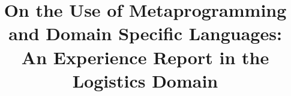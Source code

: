\documentclass[twocolumn]{bmcart}%
\begin{document}
\begin{frontmatter}

\begin{fmbox}


\title{On the Use of Metaprogramming and Domain Specific Languages: An Experience Report in the Logistics Domain}


\author[
   addressref={aff1},                   %
   corref={aff1},                       %
   email={pedro.costa@aluno.unb.br}   %
]{ }
\author[
   addressref={aff1},
   corref={aff1},
   email={ednacanedo@unb.br}
]{ }
\author[
	addressref={aff1},
	corref={aff1},
	email={rbonifacio@unb.br}
]{ }


\address[id=aff1]{%
  , %
  ,                     %
  ,                        %
}



\end{fmbox}
\end{frontmatter}
\end{document}
